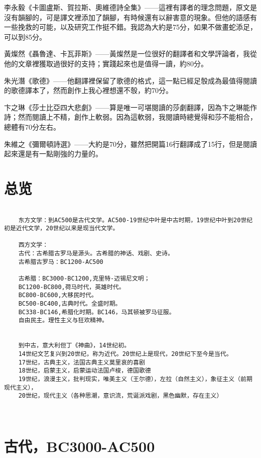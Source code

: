 \documentclass[UTF8]{../RepresentationUniverse}
\begin{document}
李永毅《卡圖盧斯、賀拉斯、奧維德詩全集》——這裡有譯者的理念問題，原文是沒有韻腳的，可是譯文裡添加了韻腳，有時候還有以辭害意的現象。但他的語感有一些挽救的可能，以及研究工作挺不錯。我認為大約是75分，如果不做畫蛇添足，可以到85分。


黃燦然《聶魯達、卡瓦菲斯》——黃燦然是一位很好的翻譯者和文學評論者，我從他的文章裡獲取過很好的支持；實踐起來也是值得一讀，約80分。


朱光潛《歌德》——他翻譯裡保留了歌德的格式，這一點已經足彀成為最值得閱讀的歌德譯本了，然而創作上我心裡想還不彀，約70分。


卞之琳《莎士比亞四大悲劇》——算是唯一可堪閱讀的莎劇翻譯，因為卞之琳能作詩；然而閱讀上不精，創作上軟弱。因為這軟弱，我閱讀時總覺得和莎不能相合，總體有70分左右。


朱維之《彌爾頓詩選》——大約是70分，雖然把開篇16行翻譯成了15行，但是閱讀起來還是有一點剛強的力量的。


\chapter{总览}



\begin{lstlisting}

    东方文学：到AC500是古代文学。AC500-19世纪中叶是中古时期，19世纪中叶到20世纪初是近代文学，20世纪以来是现当代文学。

    西方文学：
    古代：古希腊古罗马是源头。古希腊的神话、戏剧、史诗。
    古希腊古罗马：BC1200-AC500
    
    古希腊：BC3000-BC1200,克里特-迈锡尼文明；
    BC1200-BC800,荷马时代，英雄时代。
    BC800-BC600,大移民时代。
    BC500-BC400,古典时代。全盛时期。
    BC338-BC146,希腊化时期。BC146，马其顿被罗马征服。
    自由民主。理性主义与狂欢精神。
    
    
    到中古，意大利但丁《神曲》，14世纪初。
    14世纪文艺复兴到20世纪，称为近代。20世纪上是现代，20世纪下至今是当代。
    17世纪，古典主义，法国古典主义莫里哀的喜剧
    18世纪，启蒙主义，启蒙运动法国卢梭，德国歌德
    19世纪，浪漫主义，批判现实，唯美主义（王尔德），左拉（自然主义），象征主义（前期现代主义），
    20世纪，现代主义（各种思潮，意识流，荒诞派戏剧，黑色幽默，存在主义）
    
    
\end{lstlisting}




\chapter{古代，BC3000-AC500}
\end{document}
